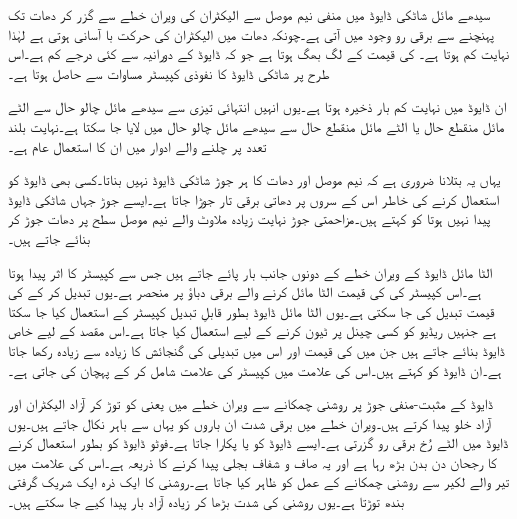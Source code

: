سیدھے مائل شاٹکی ڈایوڈ میں منفی نیم موصل سے الیکٹران کی ویران خطے سے گزر کر دھات تک پہنچنے سے برقی رو وجود میں آتی ہے۔چونکہ دھات میں الیکٹران کی حرکت  با آسانی ہوتی ہے لہٰذا   نہایت کم ہوتا ہے۔ کی قیمت  کے لگ بھگ ہوتا ہے جو کہ  ڈایوڈ کے  دورانیہ سے کئی درجے کم ہے۔اس طرح  پر شاٹکی ڈایوڈ کا نفوذی کپیسٹر مساوات   سے  حاصل ہوتا  ہے۔  

ان ڈایوڈ میں نہایت کم بار ذخیرہ ہوتا ہے۔یوں انہیں انتہائی تیزی سے سیدھے مائل چالو حال سے الٹے مائل منقطع حال یا الٹے مائل منقطع حال سے سیدھے مائل چالو حال میں لایا جا سکتا ہے۔نہایت بلند تعدد پر چلنے والے ادوار میں ان کا استعمال عام ہے۔   

یہاں یہ بتلانا ضروری ہے کہ نیم موصل اور دھات کا ہر جوڑ شاٹکی ڈایوڈ نہیں بناتا۔کسی بھی ڈایوڈ کو استعمال کرنے کی خاطر اس کے سروں پر دھاتی برقی تار جوڑا جاتا ہے۔ایسے جوڑ جہاں شاٹکی ڈایوڈ پیدا نہیں ہوتا کو   کہتے ہیں۔مزاحمتی جوڑ نہایت زیادہ ملاوٹ والے  نیم موصل سطح پر دھات جوڑ کر بنائے جاتے ہیں۔


الٹا مائل ڈایوڈ کے ویران خطے کے دونوں جانب بار پائے جاتے ہیں جس سے کپیسٹر کا اثر پیدا ہوتا ہے۔اس کپیسٹر   کی کی قیمت الٹا مائل کرنے والے برقی دباؤ  پر منحصر ہے۔یوں  تبدیل کر کے   کی قیمت تبدیل کی جا سکتی ہے۔یوں الٹا مائل ڈایوڈ بطور قابلِ تبدیل کپیسٹر کے استعمال کیا جا سکتا ہے جنہیں ریڈیو کو کسی چینل پر ٹیون کرنے کے لیے استعمال کیا جاتا ہے۔اس مقصد کے لیے خاص ڈایوڈ بنائے جاتے ہیں جن میں  کی قیمت اور اس میں تبدیلی کی گنجائش کا زیادہ سے زیادہ رکھا جاتا ہے۔ان ڈایوڈ کو   کہتے ہیں۔اس کی علامت میں کپیسٹر کی علامت شامل کر کے پہچان کی جاتی ہے۔

ڈایوڈ کے مثبت-منفی جوڑ پر روشنی چمکانے سے ویران خطے میں   یعنی    کو توڑ کر آزاد الیکٹران اور آزاد خلو پیدا کرتے ہیں۔ویران خطے میں برقی شدت ان باروں کو یہاں سے باہر نکال جاتے ہیں۔یوں ڈایوڈ میں الٹے رُخ برقی رو گزرتی ہے۔ایسے ڈایوڈ کو  یا  پکارا جاتا ہے۔فوٹو ڈایوڈ کو بطور  استعمال کرنے کا رجحان دن بدن بڑھ رہا ہے اور یہ صاف و شفاف بجلی پیدا کرنے کا ذریعہ ہے۔اس کی علامت میں تیر والے لکیر سے روشنی چمکانے کے عمل کو ظاہر کیا جاتا ہے۔روشنی کا ایک ذرہ  ایک شریک گرفتی بندھ توڑتا ہے۔یوں روشنی کی شدت بڑھا کر زیادہ آزاد بار پیدا کیے جا سکتے ہیں۔

